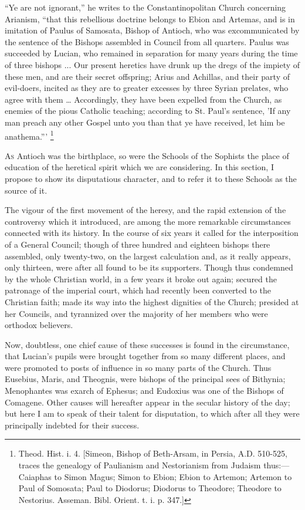 ``Ye are not ignorant,'' he writes to the
Constantinopolitan Church concerning Arianism, ``that this
rebellious doctrine belongs to Ebion and Artemas, and is in imitation
of Paulus of Samosata, Bishop of Antioch, who was excommunicated by
the sentence of the Bishops assembled in Council from all quarters.
Paulus was succeeded by Lucian, who remained in separation for many
years during the time of three bishops ... Our present heretics have
drunk up the dregs of the impiety of these men, and are their secret
offspring; Arius and Achillas, and their party of evil-doers, incited
as they are to greater excesses by three Syrian prelates, who agree
with them … Accordingly, they have been expelled from the Church, as
enemies of the pious Catholic teaching; according to St. Paul's
sentence, 'If any man preach any other Gospel unto you than that ye
have received, let him be anathema.''' \footnote{Theod. Hist. i. 4. [Simeon, Bishop of
Beth-Arsam, in Persia, A.D. 510-525, traces the
genealogy of Paulianism and Nestorianism from Judaism thus:—Caiaphas
to Simon Magus; Simon to Ebion; Ebion to Artemon; Artemon to Paul of
Somosata; Paul to Diodorus; Diodorus to Theodore; Theodore to
Nestorius. Asseman. Bibl. Orient. t. i. p. 347.]}


A\textsc{s} Antioch was the birthplace, so were the Schools of the
Sophists the place of education of the heretical spirit which we are
considering. In this section, I propose to show its disputatious
character, and to refer it to these Schools as the source of it.

The vigour of the first movement of the heresy, and the rapid
extension of the controversy which it introduced, are among the more
remarkable circumstances connected with its history. In the course of
six years it called for the interposition of a General Council; though
of three hundred and eighteen bishops there assembled, only
twenty-two, on the largest calculation and, as it really appears, only
thirteen, were after all found to be its supporters. Though thus
condemned by the whole Christian world, in a few years it broke out
again; secured the patronage of the imperial court, which had recently
been converted to the Christian faith; made its way into the highest
dignities of the Church; presided at her Councils, and tyrannized over
the majority of her members who were orthodox believers.

Now, doubtless, one chief cause of these successes is found in the
circumstance, that Lucian's pupils were brought together from so
many different places, and were promoted to posts of influence in so
many parts of the Church. Thus Eusebius, Maris, and Theognis, were
bishops of the principal sees of Bithynia; Menophantes was exarch of
Ephesus; and Eudoxius was one of the Bishops of Comagene. Other causes
will hereafter appear in the secular history of the day; but here I am
to speak of their talent for disputation, to which after all they were
principally indebted for their success.

